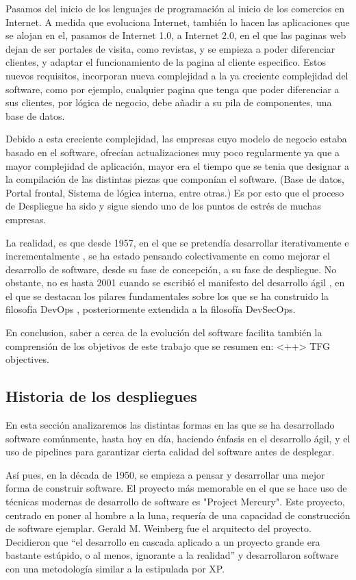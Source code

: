 \documentclass[12pt]{report} %
\begin{document}
Pasamos del inicio de los lenguajes de programación al inicio de los comercios
en Internet.  A medida que evoluciona Internet, también lo hacen las
aplicaciones que se alojan en el, pasamos de Internet 1.0, a  Internet 2.0, en
el que las paginas web dejan de ser portales de visita, como revistas, y se
empieza a poder diferenciar clientes, y adaptar el funcionamiento de la pagina
al cliente especifico.  Estos nuevos requisitos, incorporan nueva complejidad a
la ya creciente complejidad del software, como por ejemplo, cualquier pagina que
tenga que poder diferenciar a sus clientes, por lógica de negocio, debe añadir a
su pila de componentes, una base de datos.

Debido a esta creciente complejidad, las empresas cuyo modelo de negocio estaba
basado en el software, ofrecían actualizaciones muy poco regularmente ya que a
mayor complejidad de aplicación, mayor era el tiempo que se tenia que designar a
la compilación de las distintas piezas que componían el software. (Base de
datos, Portal frontal, Sistema de lógica interna, entre otras.) Es por esto que
el proceso de Despliegue ha sido y sigue siendo uno de los puntos de estrés de
muchas empresas.

La realidad, es que desde 1957, en el que se pretendía desarrollar
iterativamente e incrementalmente \cite{IID}, se ha estado pensando
colectivamente en como mejorar el desarrollo de software, desde su fase de
concepción, a su fase de despliegue.  No obstante, no es hasta 2001 cuando se
escribió el manifesto del desarrollo ágil \cite{agile}, en el que se destacan
los pilares fundamentales sobre los que se ha construido la filosofía DevOps
\cite{CD-TF}, posteriormente extendida a la filosofía DevSecOps.

En conclusion, saber a cerca de la evolución del software facilita también la
comprensión de los objetivos de este trabajo que se resumen en: <++> %
TFG objectives.


\subsection{Historia de los despliegues}

En esta sección analizaremos las distintas formas en las que se ha desarrollado
software comúnmente, hasta hoy en día, haciendo énfasis en el desarrollo ágil, y
el uso de \Gls{pipeline}s para garantizar cierta calidad del software antes de
desplegar.

Así pues, en la década de 1950, se empieza a pensar y desarrollar una mejor
forma de construir software.  El proyecto más memorable en el que se hace uso de
técnicas modernas de desarrollo de software es "Project Mercury".  Este
proyecto, centrado en poner al hombre a la luna, requería de una capacidad de
construcción de software ejemplar.  Gerald M. Weinberg fue el arquitecto del
proyecto.  Decidieron que ``el desarrollo en cascada aplicado a un proyecto
grande era bastante estúpido, o al menos, ignorante a la realidad'' \cite{GW-PM}
y desarrollaron software con una metodología similar a la estipulada por XP.
\cite{XP}
\end{document}
